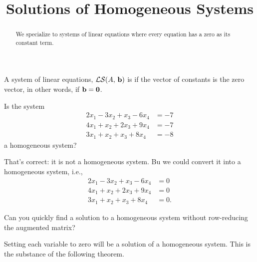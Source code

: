 \documentclass{ximera}
\title{Solutions of Homogeneous Systems}
\begin{document}
\begin{abstract}
  We specialize to systems of linear equations where every equation
  has a zero as its constant term.
\end{abstract}
\maketitle

\begin{definition}
  A system of linear equations, $\mathcal{LS}\!\left(A,\,\mathbf{b}\right)$ is
   if the vector of constants is the zero vector, in
  other words, if $\mathbf{b}=\mathbf{0}$.
\end{definition}

\begin{example}
  Is the system
  \begin{align*}
    2x_1  - 3x_2 + x_3 - 6x_4 &= -7 \\
    4x_1 +x_2 +2x_3 + 9x_4 &=  -7 \\
    3x_1 +x_2 +x_3 + 8x_4 &=  -8
  \end{align*}
  a homogeneous system?

  \begin{multipleChoice}
  \end{multipleChoice}

  \begin{feedback}[correct]
    That's correct: it is not a homogeneous system.  Bu we could convert it into a homogeneous system, i.e.,
    \begin{align*}
      2x_1  - 3x_2 + x_3 - 6x_4 &= 0 \\
      4x_1 +x_2 +2x_3 + 9x_4 &=  0 \\
      3x_1 +x_2 +x_3 + 8x_4 &=  0.
    \end{align*}
  \end{feedback}
\end{example}

\begin{question}
  Can you quickly find a solution to a homogeneous system without row-reducing the augmented matrix?

  \begin{multipleChoice}
  \end{multipleChoice}

  \begin{question}
    Setting each variable to zero will
     be a solution
    of a homogeneous system.  This is the substance of the following
    theorem.
  \end{question}
\end{question}
\end{document}
